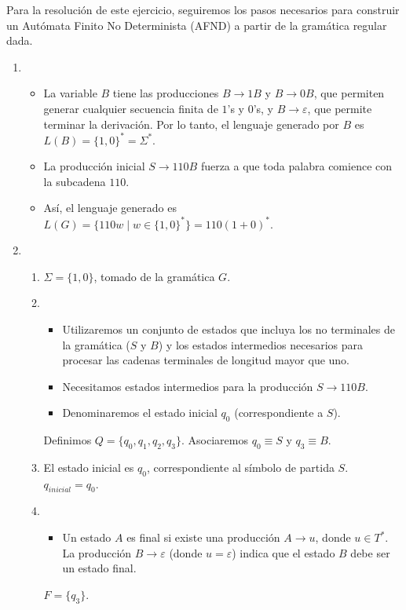 \begin{solucion}
Para la resolución de este ejercicio, seguiremos los pasos necesarios para construir un Autómata Finito No Determinista (AFND) a partir de la gramática regular dada. \\
\begin{enumerate}
    \item {}
    \begin{itemize}
        \item La variable $B$ tiene las producciones $B \to 1B$ y $B \to 0B$, que permiten generar cualquier secuencia finita de $1$'s y $0$'s, y $B \to \varepsilon$, que permite terminar la derivación. Por lo tanto, el lenguaje generado por $B$ es $L(B) = \{1, 0\}^* = \Sigma^*$.
        \item La producción inicial $S \to 110B$ fuerza a que toda palabra comience con la subcadena $110$.
        \item Así, el lenguaje generado es $L(G) = \{110w \mid w \in \{1, 0\}^*\} = 110(1+0)^*$.
    \end{itemize}

    \item {}
    \begin{enumerate}
        \item {} $\Sigma = \{1, 0\}$, tomado de la gramática $G$.
        \item {}
        \begin{itemize}
            \item Utilizaremos un conjunto de estados que incluya los no terminales de la gramática ($S$ y $B$) y los estados intermedios necesarios para procesar las cadenas terminales de longitud mayor que uno.
            \item Necesitamos estados intermedios para la producción $S \to 110B$.
            \item Denominaremos el estado inicial $q_0$ (correspondiente a $S$).
        \end{itemize}
        Definimos $Q = \{q_0, q_1, q_2, q_3\}$. Asociaremos $q_0 \equiv S$ y $q_3 \equiv B$.
        \item {} El estado inicial es $q_0$, correspondiente al símbolo de partida $S$. $q_{inicial} = q_0$.
        \item {}
        \begin{itemize}
            \item Un estado $A$ es final si existe una producción $A \to u$, donde $u \in T^*$. La producción $B \to \varepsilon$ (donde $u = \varepsilon$) indica que el estado $B$ debe ser un estado final.
        \end{itemize}
        $F = \{q_3\}$.
    \end{enumerate}


\end{enumerate}
\end{solucion}
